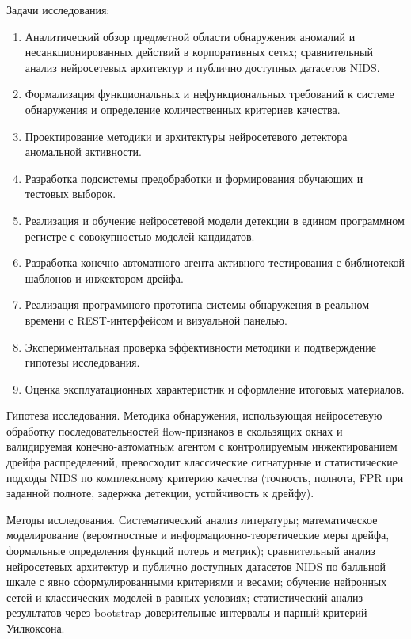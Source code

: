 Задачи исследования:
\begin{enumerate}
    \item Аналитический обзор предметной области обнаружения
    аномалий и несанкционированных действий в корпоративных сетях;
    сравнительный анализ нейросетевых архитектур и публично
    доступных датасетов NIDS.
    \item Формализация функциональных и нефункциональных требований
    к системе обнаружения и определение количественных критериев
    качества.
    \item Проектирование методики и архитектуры нейросетевого
    детектора аномальной активности.
    \item Разработка подсистемы предобработки и формирования
    обучающих и тестовых выборок.
    \item Реализация и обучение нейросетевой модели детекции в
    едином программном регистре с совокупностью моделей-кандидатов.
    \item Разработка конечно-автоматного агента активного
    тестирования с библиотекой шаблонов и инжектором дрейфа.
    \item Реализация программного прототипа системы обнаружения
    в реальном времени с REST-интерфейсом и визуальной панелью.
    \item Экспериментальная проверка эффективности методики и
    подтверждение гипотезы исследования.
    \item Оценка эксплуатационных характеристик и оформление
    итоговых материалов.
\end{enumerate}

Гипотеза исследования. Методика обнаружения, использующая
нейросетевую обработку последовательностей flow-признаков в
скользящих окнах и валидируемая конечно-автоматным агентом с
контролируемым инжектированием дрейфа распределений, превосходит
классические сигнатурные и статистические подходы NIDS по
комплексному критерию качества (точность, полнота, FPR при
заданной полноте, задержка детекции, устойчивость к дрейфу).

Методы исследования. Систематический анализ литературы;
математическое моделирование (вероятностные и
информационно-теоретические меры дрейфа, формальные определения
функций потерь и метрик); сравнительный анализ нейросетевых
архитектур и публично доступных датасетов NIDS по балльной шкале с
явно сформулированными критериями и весами; обучение нейронных
сетей и классических моделей в равных условиях; статистический
анализ результатов через bootstrap-доверительные интервалы и
парный критерий Уилкоксона.

